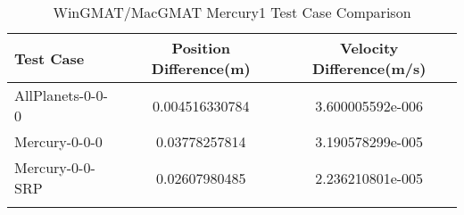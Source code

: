 \begin{table}[htbp!]
\centering
\caption{ WinGMAT/MacGMAT Mercury1 Test Case Comparison}
      \begin{tabular}{lcc}
      \hline\hline
          Test Case & Position Difference(m) & Velocity Difference(m/s) \\
         \hline
         AllPlanets-0-0-0 & 0.004516330784 & 3.600005592e-006 \\
         Mercury-0-0-0 & 0.03778257814 & 3.190578299e-005 \\
         Mercury-0-0-SRP & 0.02607980485 & 2.236210801e-005 \\
      \hline\hline
      \label{Table: Mercury1 WinGMAT-MacGMAT Table} 
\end{tabular}
\end{table}
